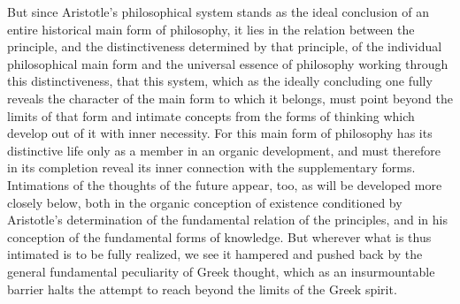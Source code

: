 But since Aristotle's philosophical system stands as the ideal
conclusion of an entire historical main form of philosophy, it lies in
the relation between the principle, and the distinctiveness determined
by that principle, of the individual philosophical main form and the
universal essence of philosophy working through this distinctiveness,
that this system, which as the ideally concluding one fully reveals the
character of the main form to which it belongs, must point beyond the
limits of that form and intimate concepts from the forms of thinking
which develop out of it with inner necessity. For this main form of
philosophy has its distinctive life only as a member in an organic
development, and must therefore in its completion reveal its inner
connection with the supplementary forms. Intimations of the thoughts of
the future appear, too, as will be developed more closely below, both
in the organic conception of existence conditioned by Aristotle's
determination of the fundamental relation of the principles, and in his
conception of the fundamental forms of knowledge. But wherever what is
thus intimated is to be fully realized, we see it hampered and pushed
back by the general fundamental peculiarity of Greek thought, which as
an insurmountable barrier halts the attempt to reach beyond the limits
of the Greek spirit.

